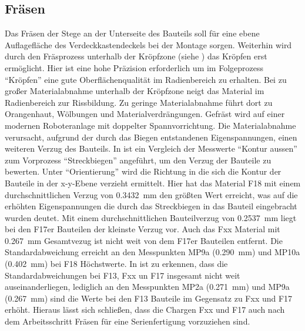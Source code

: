 \documentclass[12pt,a4paper,parskip]{scrartcl}
\begin{document}
\subsection{Fräsen}
Das Fräsen der Stege an der Unterseite des Bauteils soll für eine ebene Auflagefläche des  Verdeckkastendeckels bei der Montage sorgen. Weiterhin wird durch den Fräsprozess unterhalb der Kröpfzone (siehe )  das Kröpfen erst ermöglicht. Hier ist eine hohe Präzision erforderlich um im Folgeprozess "`Kröpfen"' eine gute Oberflächenqualität im Radienbereich zu erhalten. Bei zu großer Materialabnahme unterhalb der Kröpfzone neigt das Material im Radienbereich zur Rissbildung. Zu geringe Materialabnahme führt dort zu Orangenhaut, Wölbungen und Materialverdrängungen. Gefräst wird auf einer modernen Roboteranlage mit doppelter Spannvorrichtung. Die Materialabnahme verursacht,  aufgrund der durch das Biegen entstandenen Eigenspannungen,  einen weiteren Verzug des Bauteils. In   ist ein Vergleich der Messwerte "`Kontur aussen"' zum Vorprozess "`Streckbiegen"' angeführt,  um den Verzug der Bauteile zu bewerten. Unter "`Orientierung"' wird die Richtung in die sich die Kontur der Bauteile in der x-y-Ebene verzieht ermittelt. Hier hat das Material F18 mit einem durchschnittlichen Verzug von \SI{0,3432}{\milli\meter} den größten Wert erreicht, was auf die erhöhten Eigenspannungen  die durch das Streckbiegen in das Bauteil eingebracht wurden deutet. Mit einem durchschnittlichen Bauteilverzug von \SI{0,2537}{\milli\meter} liegt bei den F17er Bauteilen der kleinste  Verzug vor. Auch das Fxx Material mit \SI{0,267}{\milli\meter} Gesamtvezug ist nicht weit von dem F17er Bauteilen entfernt. Die Standardabweichung erreicht an den Messpunkten MP9a (\SI{0,290}{\milli\meter}) und MP10a (\SI{0,402}{\milli\meter}) bei F18 Höchstwerte. In  ist zu erkennen, dass  die Standardabweichungen bei F13, Fxx un F17 insgesamt nicht weit auseinanderliegen, lediglich an den Messpunkten MP2a (\SI{0,271}{\milli\meter}) und MP9a (\SI{0,267}{\milli\meter}) sind die Werte bei den F13 Bauteile im Gegensatz zu Fxx und F17 erhöht. 
Hieraus lässt sich schließen, dass die Chargen Fxx und F17 auch nach dem Arbeitsschritt Fräsen für eine Serienfertigung vorzuziehen sind. 
\end{document}
